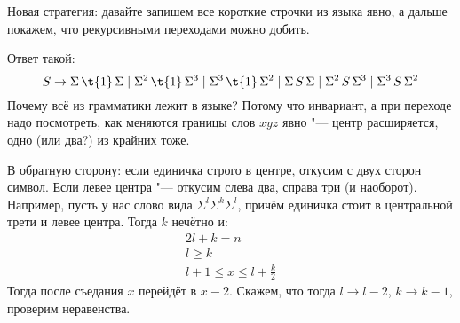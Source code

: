 	Новая стратегия: давайте запишем все короткие строчки из языка явно, а дальше покажем, что
	рекурсивными переходами можно добить.
	
	Ответ такой:
	\[ S \to \Sigma\,\t{1}\,\Sigma \mid \Sigma^2\,\t{1}\,\Sigma^3 \mid \Sigma^3\,\t{1}\,\Sigma^2 \mid \Sigma\,S\,\Sigma \mid \Sigma^2\,S\,\Sigma^3 \mid \Sigma^3\,S\,\Sigma^2 \]
	Почему всё из грамматики лежит в языке? Потому что инвариант, а при переходе надо посмотреть, как меняются границы слов $xyz$ явно "--- центр расширяется, одно (или два?) из крайних тоже.

	В обратную сторону: если единичка строго в центре, откусим с двух сторон символ.
	Если левее центра "--- откусим слева два, справа три (и наоборот).
	Например, пусть у нас слово вида $\Sigma^l\Sigma^k\Sigma^l$, причём единичка стоит в центральной трети и левее центра.
	Тогда $k$ нечётно и:
	\begin{gather*}
		2l+k=n \\
		l \ge k \\
		l+1 \le x \le l+\frac{k}{2}
	\end{gather*}
	Тогда после съедания $x$ перейдёт в $x-2$.
	Скажем, что тогда $l \to l - 2$, $k \to k - 1$, проверим неравенства.
